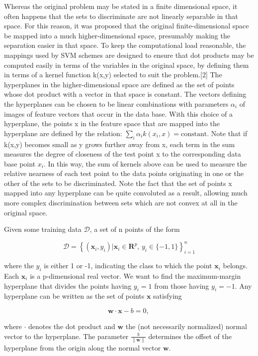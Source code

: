 \documentclass[12pt]{book}
\begin{document}
Whereas the original problem may be stated in a finite dimensional space, it often happens that the sets to discriminate are not linearly 
separable in that space. For this reason, it was proposed that the original finite-dimensional space be mapped into a much higher-dimensional 
space, presumably making the separation easier in that space. To keep the computational load reasonable, the mappings used by SVM schemes 
are designed to ensure that dot products may be computed easily in terms of the variables in the original space, by defining them in terms of 
a kernel function k(x,y) selected to suit the problem.[2] The hyperplanes in the higher-dimensional space are defined as the set of points whose dot 
product with a vector in that space is constant. The vectors defining the hyperplanes can be chosen to be linear combinations with parameters $\alpha_i$ 
of images of feature vectors that occur in the data base. With this choice of a hyperplane, the points x in the feature space that are mapped into the hyperplane are defined by the relation: 
$\textstyle\sum_i \alpha_i k(x_i,x) = \mathrm{constant}$. Note that if k(x,y) becomes small as y grows further away from x, each term in the sum 
measures the degree of closeness of the test point x to the corresponding data base point $x_i$. In this way, the sum of kernels above can be used to measure the relative
nearness of each test point to the data points originating in one or the other of the sets to be discriminated. Note the fact that the set of points x mapped into any hyperplane 
can be quite convoluted as a result, allowing much more complex discrimination between sets which are not convex at all in the original space.

Given some training data $\mathcal{D}$, a set of n points of the form

$$\mathcal{D} = \left\{ (\mathbf{x}_i, y_i) | \mathbf{x}_i \in \mathbf{R}^p,\, y_i \in \{-1,1\}\right\}_{i=1}^n$$

where the $y_i$ is either 1 or -1, indicating the class to which the point $\mathbf{x}_i$  belongs. Each  $\mathbf{x}_i$  is a p-dimensional real vector. 
We want to find the maximum-margin hyperplane that divides the points having $y_i=1$ from those having $y_i=-1$. Any hyperplane can be written as the set of points $\mathbf{x}$ satisfying

$$ \mathbf{w}\cdot\mathbf{x} - b=0,\, $$

where $\cdot$ denotes the dot product and ${\mathbf{w}}$ the (not necessarily normalized) normal vector to the hyperplane. The parameter $\tfrac{b}{\|\mathbf{w}\|}$ determines the offset of the 
hyperplane from the origin along the normal vector ${\mathbf{w}}$.
\end{document}
